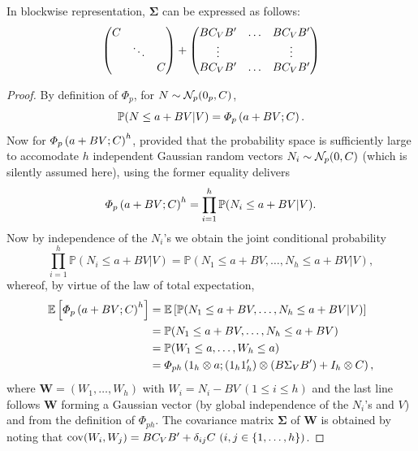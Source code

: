 \documentclass[aoas]{imsart}
\begin{document}
\begin{remark}
In blockwise representation, $\bm{\Sigma}$ can be expressed as follows:
\begin{align*}
\begin{pmatrix}
    \covN & &\\
        & \ddots &\\
        &   & \covN
\end{pmatrix}
+
\begin{pmatrix}
B\covV B' & \dots & B\covV  B'\\
\vdots & & \vdots\\
B\covV B' & \dots & B\covV B'\\
\end{pmatrix}
\end{align*}
\end{remark}

\begin{proof}
By definition of $\Phi_{p}$, for $N\sim \mathcal{N}_{p}(0_{p},C)$,
$$
\mathbb{P}(N\leq a + BV | V)
=
\varPhi_{p}\left( a + BV; C \right).
$$
Now for $\varPhi_{p}\left( a + BV; C \right)^h$, provided that the probability space is sufficiently large to accomodate $h$ independent Gaussian random vectors $N_i\sim \mathcal{N}_{p}(0,C)$ (which is silently assumed here), using the former equality delivers
$$
\varPhi_{p}\left( a + BV; C \right)^h
=
\prod_{i=1}^h \mathbb{P}(N_i\leq a + BV | V).
$$
Now by independence of the $N_i$'s we obtain the joint conditional probability
$$
\prod_{i=1}^h \mathbb{P}(N_i\leq a + BV | V)
=
\mathbb{P}(N_1\leq a + BV, \dots, N_h\leq a + BV| V),
$$
whereof, by virtue of the law of total expectation,
\begin{equation*}
\begin{split}
\mathbb{E}\left[ \varPhi_{p}\left( a + BV; \covN \right)^h \right]
&=\mathbb{E}\left[\mathbb{P}(N_1\leq a + BV, \dots, N_h\leq a + BV| V)\right]\\
&=\mathbb{P}(N_1\leq a + BV, \dots, N_h\leq a + BV)\\
&=\mathbb{P}(W_1 \leq a, \dots, W_h\leq a)\\
&=\varPhi_{ph}
\left(
1_{h} \otimes a
;
(1_{h}1_{h}')\otimes (B\Sigma_{V} B') + 
I_{h}\otimes \covN
\right),
\end{split}
\end{equation*}
where $\mathbf{W}=(W_1,\dots,W_h)$ with $W_i=N_i- BV \ (1\leq i \leq h)$
and the last line follows $\mathbf{W}$ forming a Gaussian vector (by global independence of the $N_i$'s and $V$) and from the definition of $\varPhi_{p h}$. The covariance matrix $\mathbf{\Sigma}$ of $\mathbf{W}$ is obtained by noting that $\operatorname{cov}(W_i,W_j)=B \covV B' + \delta_{ij} \covN \ 
(i,j \in \{1,\dots,h\})$.
\end{proof}
\end{document}
